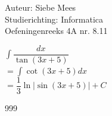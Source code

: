 \documentclass[a4paper]{article}
\begin{document}
  
\noindent \large Auteur: Siebe Mees \\
\noindent \large Studierichting: Informatica\\
\noindent \large Oefeningenreeks 4A nr. 8.11\\

\medskip

\normalsize

$\displaystyle\int \dfrac{dx}{\tan(3x+5)}$\\

$ = \displaystyle\int \cot(3x+5) dx $\\

$ = \dfrac{1}{3} \ln |\sin(3x+5)| + C $\\


\begin{thebibliography}{999}
\end{thebibliography}
\end{document}
